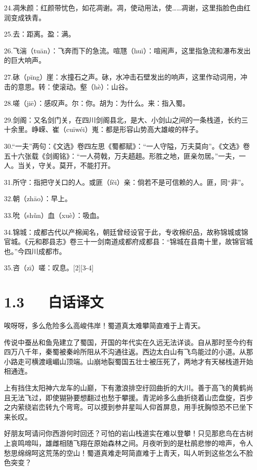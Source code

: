 \documentclass[letterpaper,12pt,english]{sphinxmanual}
\begin{document}
24.凋朱颜：红颜带忧色，如花凋谢。凋，使动用法，使……凋谢，这里指脸色由红润变成铁青。

25.去：距离。盈：满。

26.飞湍（tuān）：飞奔而下的急流。喧豗（huī）：喧闹声，这里指急流和瀑布发出的巨大响声。

27.砯（pīng）崖：水撞石之声。砯，水冲击石壁发出的响声，这里作动词用，冲击的意思。转：使滚动。壑（hè）：山谷。

28.嗟（jiē）：感叹声。尔：你。胡为：为什么。来：指入蜀。

29.剑阁：又名剑门关，在四川剑阁县北，是大、小剑山之间的一条栈道，长约三十余里。峥嵘、崔（cuīwéi）嵬：都是形容山势高大雄峻的样子。

30.“一夫”两句：《文选》卷四左思《蜀都赋》：“一人守隘，万夫莫向”。《文选》卷五十六张载《剑阁铭》：“一人荷戟，万夫趦趄。形胜之地，匪亲勿居。”一夫，一人。当关，守关。莫开，不能打开。

31.所守：指把守关口的人。或匪（fěi）亲：倘若不是可信赖的人。匪，同“非”。

32.朝（zhāo）：早上。

33.吮（shǔn）血（xuè）：吸血。

34.锦城：成都古代以产棉闻名，朝廷曾经设官于此，专收棉织品，故称锦城或锦官城。《元和郡县志》卷三十一剑南道成都府成都县：“锦城在县南十里，故锦官城也。”今四川成都市。

35.咨（zī）嗟：叹息。{[}2{]}{[}3-4{]}


\section{1.3   白话译文}
\label{\detokenize{p01_u6563_u6587/_u674e_u767d-_u8700_u9053_u96be:id5}}
唉呀呀，多么危险多么高峻伟岸！蜀道真太难攀简直难于上青天。

传说中蚕丛和鱼凫建立了蜀国，开国的年代实在久远无法详谈。自从那时至今约有四万八千年，秦蜀被秦岭所阻从不沟通往返。西边太白山有飞鸟能过的小道。从那小路走可横渡峨嵋山顶端。山崩地裂蜀国五壮士被压死了，两地才有天梯栈道开始相通连。

上有挡住太阳神六龙车的山巅，下有激浪排空纡回曲折的大川。善于高飞的黄鹤尚且无法飞过，即使猢狲要想翻过也愁于攀援。青泥岭多么曲折绕着山峦盘旋，百步之内萦绕岩峦转九个弯弯。可以摸到参井星叫人仰首屏息，用手抚胸惊恐不已坐下来长叹。

好朋友呵请问你西游何时回还？可怕的岩山栈道实在难以登攀！只见那悲鸟在古树上哀鸣啼叫，雄雌相随飞翔在原始森林之间。月夜听到的是杜鹃悲惨的啼声，令人愁思绵绵呵这荒荡的空山！蜀道真难走呵简直难于上青天，叫人听到这些怎么不脸色突变？
\end{document}
